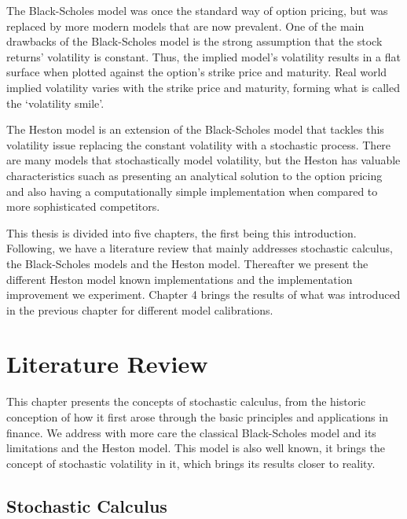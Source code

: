 \documentclass[12pt,twoside]{reedthesis}
\theoremstyle{definition}
\theoremstyle{definition}
\theoremstyle{remark}
\begin{document}
  The Black-Scholes model was once the standard way of option pricing, but
  was replaced by more modern models that are now prevalent. One of the
  main drawbacks of the Black-Scholes model is the strong assumption that
  the stock returns' volatility is constant. Thus, the implied model's
  volatility results in a flat surface when plotted against the option's
  strike price and maturity. Real world implied volatility varies with the
  strike price and maturity, forming what is called the `volatility
  smile'.
  
  The Heston model is an extension of the Black-Scholes model that tackles
  this volatility issue replacing the constant volatility with a
  stochastic process. There are many models that stochastically model
  volatility, but the Heston has valuable characteristics suach as
  presenting an analytical solution to the option pricing and also having
  a computationally simple implementation when compared to more
  sophisticated competitors.
  
  This thesis is divided into five chapters, the first being this
  introduction. Following, we have a literature review that mainly
  addresses stochastic calculus, the Black-Scholes models and the Heston
  model. Thereafter we present the different Heston model known
  implementations and the implementation improvement we experiment.
  Chapter 4 brings the results of what was introduced in the previous
  chapter for different model calibrations.
  
  \chapter{Literature Review}\label{lt-review}
  
  This chapter presents the concepts of stochastic calculus, from the
  historic conception of how it first arose through the basic principles
  and applications in finance. We address with more care the classical
  Black-Scholes model and its limitations and the Heston model. This model
  is also well known, it brings the concept of stochastic volatility in
  it, which brings its results closer to reality.
  
  \section{Stochastic Calculus}\label{stochastic-calculus}
  
\end{document}
